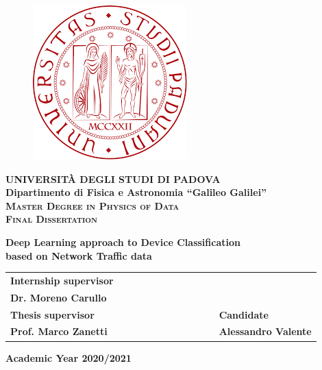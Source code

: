 \begin{titlepage}
\vspace{5mm}
\begin{figure}[hbtp]
\centering
\includegraphics[scale=.43]{images/UNIPD.png}
\end{figure}
\vspace{5mm}
\begin{center}
{{\huge{\textsc{\bf UNIVERSIT\`A DEGLI STUDI DI PADOVA}}}\\}
\vspace{5mm}
{\Large{\bf Dipartimento di Fisica e Astronomia ``Galileo Galilei''}} \\
\vspace{5mm}
{\Large{\textsc{\bf Master Degree in Physics of Data}}}\\
\vspace{15mm}
{\Large{\textsc{\bf Final Dissertation}}}\\
\vspace{18mm}
\begin{spacing}{3}
{\LARGE \textbf{Deep Learning approach to Device Classification\\ based on Network Traffic data }}\\
\end{spacing}
\vspace{8mm}
\end{center}

\vspace{20mm}
\begin{spacing}{2}
\begin{tabular}{ l  c  c c c  cc c c c c  l }
{\Large{\bf Internship supervisor}}\\
{\Large{\bf Dr. Moreno Carullo}}\\
{\Large{\bf Thesis supervisor}} &&&&&&&&&&& {\Large{\bf Candidate}}\\
{\Large{\bf Prof. Marco Zanetti}} &&&&&&&&&&& {\Large{\bf Alessandro Valente}}\\
\end{tabular}
\end{spacing}
\vspace{15 mm}

\begin{center}
{\Large{\bf Academic Year 2020/2021}}
\end{center}
\end{titlepage}







